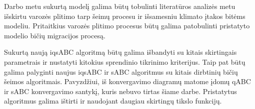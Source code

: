 \documentclass{VUMIFKompMagistrinis}
\begin{document}
Darbo metu sukurtą modelį galima būtų tobulinti literatūros analizės metu išskirtu varozės plitimo tarp šeimų procesu ir išsamesniu klimato įtakos bitėms modeliu. Pritaitkius varozės plitimo procesus būtų galima patobulinti pristatyto modelio bičių migracijos procesą.




Sukurtą naują iqsABC algoritmą būtų galima išbandyti su kitais skirtingais parametrais ir nustatyti kitokius sprendinio tikrinimo kriterijus. Taip pat būtų galima palyginti naujus iqsABC ir sABC algoritmus su kitais dirbtinių bičių šeimos algoritmais. Pavyzdžiui, iš konvergavimo diagramų matome įdomų qABC ir sABC konvergavimo santykį, kuris nebuvo tirtas šiame darbe. Pristatytus algoritmus galima ištirti ir naudojant daugiau skirtingų tikslo funkcijų.



\end{document}
